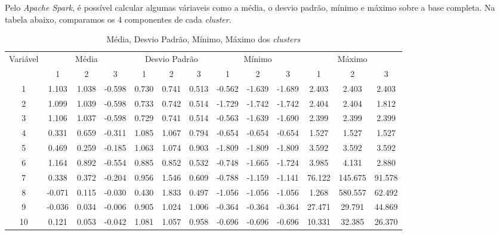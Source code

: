 Pelo \emph{Apache Spark}, é possível calcular algumas váriaveis como a média, o desvio padrão, mínimo e máximo sobre a base completa. Na tabela abaixo, comparamos os 4 componentes de cada \emph{cluster}.

\begin{table}
\tiny
\centering
        \caption{Média, Desvio Padrão, Mínimo, Máximo dos \emph{clusters}}
        \label{multiprogram}
        \begin{tabular}{c | c c c | c c c | c c c | c c c } \toprule
             Variável & \multicolumn{3}{|c|}{Média} & \multicolumn{3}{|c|}{Desvio Padrão} & \multicolumn{3}{|c|}{Mínimo} & \multicolumn{3}{|c}{Máximo}\\
             & 1 & 2 & 3 & 1 & 2 & 3 & 1 & 2 & 3 & 1 & 2 & 3\\
             \hline
            \multicolumn{1}{c|}{1} & 1.103  & 1.038  & -0.598 & 0.730 & 0.741 & 0.513 & -0.562 & -1.639 & -1.689 & 2.403   & 2.403   & 2.403  \\
            \multicolumn{1}{c|}{2} & 1.099  & 1.039  & -0.598 & 0.733 & 0.742 & 0.514 & -1.729 & -1.742 & -1.742 & 2.404   & 2.404   & 1.812  \\
            \multicolumn{1}{c|}{3} & 1.106  & 1.037  & -0.598 & 0.729 & 0.741 & 0.514 & -0.563 & -1.639 & -1.690 & 2.399   & 2.399   & 2.399  \\
            \multicolumn{1}{c|}{4} & 0.331  & 0.659  & -0.311 & 1.085 & 1.067 & 0.794 & -0.654 & -0.654 & -0.654 & 1.527   & 1.527   & 1.527  \\
            \multicolumn{1}{c|}{5} & 0.469  & 0.259  & -0.185 & 1.063 & 1.074 & 0.903 & -1.809 & -1.809 & -1.809 & 3.592   & 3.592   & 3.592  \\
            \multicolumn{1}{c|}{6} & 1.164  & 0.892  & -0.554 & 0.885 & 0.852 & 0.532 & -0.748 & -1.665 & -1.724 & 3.985   & 4.131   & 2.880  \\
            \multicolumn{1}{c|}{7} & 0.338  & 0.372  & -0.204 & 0.956 & 1.546 & 0.609 & -0.788 & -1.159 & -1.141 & 76.122  & 145.675 & 91.578 \\
            \multicolumn{1}{c|}{8} & -0.071 & 0.115  & -0.030 & 0.430 & 1.833 & 0.497 & -1.056 & -1.056 & -1.056 & 1.268   & 580.557 & 62.492 \\
            \multicolumn{1}{c|}{9} & -0.036 & 0.034  & -0.006 & 0.905 & 1.024 & 1.006 & -0.364 & -0.364 & -0.364 & 27.471  & 29.791  & 44.869 \\
            \multicolumn{1}{c|}{10} & 0.121  & 0.053  & -0.042 & 1.081 & 1.057 & 0.958 & -0.696 & -0.696 & -0.696 & 10.331  & 32.385  & 26.370 \\

\end{tabular}
\end{table}
